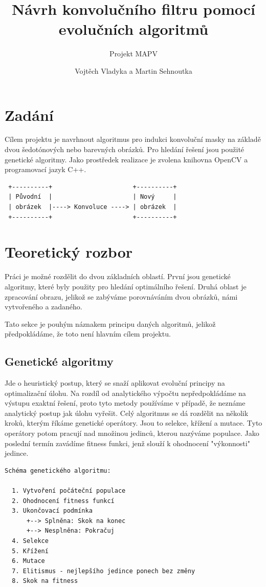 \documentclass[a4paper,11pt]{scrartcl}
\title{Návrh konvolučního filtru pomocí evolučních algoritmů}
\subtitle{Projekt MAPV}
\author{Vojtěch Vladyka a Martin Sehnoutka}
\begin{document}
\maketitle
\tableofcontents

\section{Zadání}
Cílem projektu je navrhnout algoritmus pro indukci konvoluční masky na základě dvou šedotónových nebo barevných obrázků. Pro hledání řešení jsou použité genetické algoritmy. Jako prostředek realizace je zvolena knihovna OpenCV a programovací jazyk C++.

\begin{verbatim}
 +----------+                      +----------+
 | Původní  |                      | Nový     |
 | obrázek  |----> Konvoluce ----> | obrázek  |
 +----------+                      +----------+
\end{verbatim}

\section{Teoretický rozbor}

Práci je možné rozdělit do dvou základních oblastí. První jsou genetické algoritmy, které byly použity pro hledání optimálního řešení. Druhá oblast je zpracování obrazu, jelikož se zabýváme porovnáváním dvou obrázků, námi vytvořeného a zadaného.

Tato sekce je pouhým náznakem principu daných algoritmů, jelikož předpokládáme, že toto není hlavním cílem projektu.

\subsection{Genetické algoritmy}

Jde o heuristický postup, který se snaží aplikovat evoluční principy na optimalizační úlohu. Na rozdíl od analytického výpočtu nepředpokládáme na výstupu exaktní řešení, proto tyto metody používáme v případě, že neznáme analytický postup jak úlohu vyřešit. Celý algoritmus se dá rozdělit na několik kroků, kterým říkáme genetické operátory. Jsou to selekce, křížení a mutace. Tyto operátory potom pracují nad množinou jedinců, kterou nazýváme populace. Jako poslední termín zavádíme fitness funkci, jenž slouží k ohodnocení "výkonnosti" jedince.

\begin{verbatim}
Schéma genetického algoritmu:

  1. Vytvoření počáteční populace
  2. Ohodnocení fitness funkcí
  3. Ukončovací podmínka
      +--> Splněna: Skok na konec 
      +--> Nesplněna: Pokračuj
  4. Selekce
  5. Křížení
  6. Mutace
  7. Elitismus - nejlepšího jedince ponech bez změny
  8. Skok na fitness
\end{verbatim}
\end{document}
